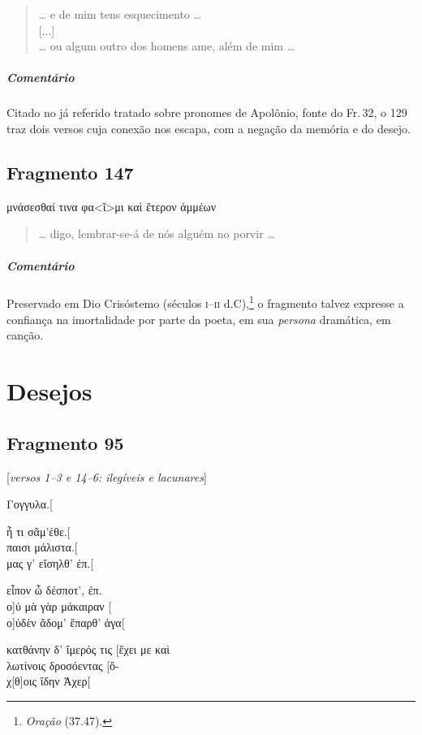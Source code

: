 \begin{verse}
\ldots{} e de mim tens esquecimento \ldots{}\\[2mm]

\hspace*{17mm}[...]\\[2mm]

\ldots{} ou algum outro dos homens ame, além de mim \ldots{}
\end{verse}

\medskip

\paragraph{Comentário}
Citado no já referido tratado sobre pronomes de Apolônio, fonte do Fr.\,32, o 129 traz dois versos cuja conexão nos escapa, com a negação da memória e do desejo.


\pagebreak

\section{Fragmento 147}

\begin{gkverse}
μνάσεσθαί τινα φα<ῖ>μι \dagger{}καὶ ἔτερον\dagger{} ἀμμέων
\end{gkverse}

\begin{verse}
\ldots{} digo, lembrar-se-á de nós alguém no porvir \ldots{}
\end{verse}

\medskip

{\paragraph{Comentário} Preservado em Dio Crisóstemo (séculos \textsc{i--ii} d.C),\footnote{\emph{Oração} (37.47).} o fragmento talvez expresse a confiança na imortalidade por parte da poeta, em sua \emph{persona} dramática, em canção.}


\chapter{Desejos}

\section{Fragmento 95}

\begin{gkverse}
\textnormal{[\emph{versos 1--3 e 14--6: ilegíveis e lacunares}]}

Γογγυλα.[

ἦ τι σᾶμ’ἐθε.[\\
παισι μάλιστα.[\\
μας γ’ εἴσηλθ’ ἐπ.[

εἶπον ὦ δέσποτ’, ἐπ.\\
ο]ὐ μὰ γὰρ μάκαιραν [\\
ο]ὐδὲν ἄδομ’ ἔπαρθ’ ἀγα[

κατθάνην δ’ ἴμερός τις [ἔχει με καὶ\\
λωτίνοις δροσόεντας [ὄ-\\
χ[θ]οις ἴδην Ἀχερ[
\end{gkverse}



